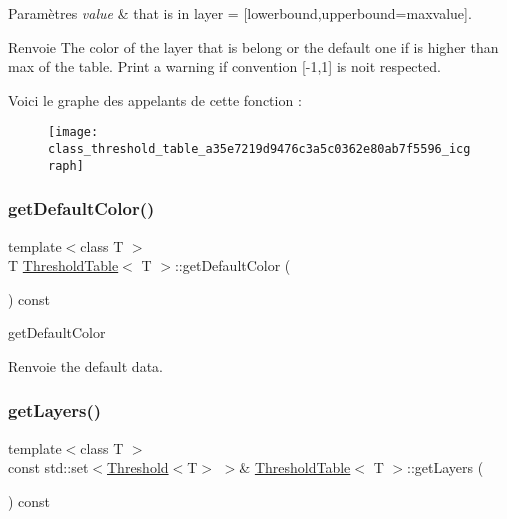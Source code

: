 \begin{DoxyParams}{Paramètres}
{\em value} & that is in layer = \mbox{[}lowerbound,upperbound=maxvalue\mbox{]}. \\
\hline
\end{DoxyParams}
\begin{DoxyReturn}{Renvoie}
The color of the layer that is belong or the default one if is higher than max of the table. Print a warning if convention \mbox{[}-\/1,1\mbox{]} is noit respected. 
\end{DoxyReturn}
Voici le graphe des appelants de cette fonction \+:
\nopagebreak
\begin{figure}[H]
\begin{center}
\leavevmode
\texttt{[image: class\_threshold\_table\_a35e7219d9476c3a5c0362e80ab7f5596\_icgraph]}
\end{center}
\end{figure}
\mbox{\label{class_threshold_table_ac20ccb2dd4cd20e96036818ca0106f93}} 
\subsubsection{\texorpdfstring{get\+Default\+Color()}{getDefaultColor()}}
{\footnotesize\ttfamily template$<$class T $>$ \\
T \hyperlink{class_threshold_table}{Threshold\+Table}$<$ T $>$\+::get\+Default\+Color (\begin{DoxyParamCaption}{ }\end{DoxyParamCaption}) const\hspace{0.3cm}{\ttfamily [inline]}}



get\+Default\+Color 

\begin{DoxyReturn}{Renvoie}
the default data. 
\end{DoxyReturn}
\mbox{\label{class_threshold_table_a6cb1745a571a4e071e9b74ad34372405}} 
\subsubsection{\texorpdfstring{get\+Layers()}{getLayers()}}
{\footnotesize\ttfamily template$<$class T $>$ \\
const std\+::set$<$\hyperlink{struct_threshold}{Threshold}$<$T$>$ $>$\& \hyperlink{class_threshold_table}{Threshold\+Table}$<$ T $>$\+::get\+Layers (\begin{DoxyParamCaption}{ }\end{DoxyParamCaption}) const\hspace{0.3cm}{\ttfamily [inline]}}



